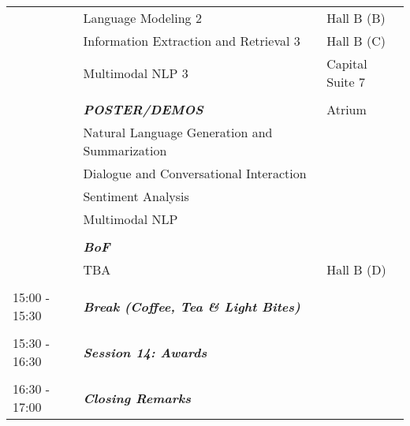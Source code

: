\begin{longtable}{p{15mm}p{60mm}p{30mm}}
& Language Modeling 2 & Hall B (B) \\
& Information Extraction and Retrieval 3 & Hall B (C) \\
& Multimodal NLP 3 & Capital Suite 7 \\\\
& \emph{\textbf{POSTER/DEMOS}} & Atrium \\
& Natural Language Generation and Summarization & \\
& Dialogue and Conversational Interaction & \\
& Sentiment Analysis & \\
& Multimodal NLP & \\\\
& \emph{\textbf{BoF}} & \\
& TBA & Hall B (D) \\\\
{15:00 - 15:30} & \emph{\textbf{Break (Coffee, Tea \& Light Bites)}} & \\\\
{15:30 - 16:30} & \emph{\textbf{Session 14: Awards}} & \\\\
{16:30 - 17:00} & \emph{\textbf{Closing Remarks}} & \\
\end{longtable}
